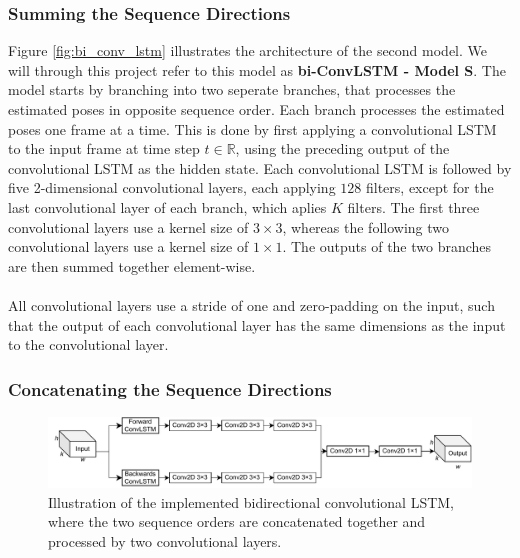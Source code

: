\documentclass[./main.tex]{subfiles}
\begin{document}
\subsubsection{Summing the Sequence Directions}
Figure \ref{fig:bi_conv_lstm} illustrates the architecture of the second model. We will through this project refer to this model as \textbf{bi-ConvLSTM - Model S}. The model starts by branching into two seperate branches, that processes the estimated poses in opposite sequence order. Each branch processes the estimated poses one frame at a time. This is done by first applying a convolutional LSTM to the input frame at time step $t \in \mathbb{R}$, using the preceding output of the convolutional LSTM as the hidden state. Each convolutional LSTM is followed by five 2-dimensional convolutional layers, each applying $128$ filters, except for the last convolutional layer of each branch, which aplies $K$ filters. The first three convolutional layers use a kernel size of $3 \times 3$, whereas the following two convolutional layers use a kernel size of $1 \times 1$. The outputs of the two branches are then summed together element-wise.
\\
\\
All convolutional layers use a stride of one and zero-padding on the input, such that the output of each convolutional layer has the same dimensions as the input to the convolutional layer.

\subsubsection{Concatenating the Sequence Directions}
\begin{figure}[htbp]
    \centering
    \includegraphics[width=\textwidth]{./entities/unipose2.pdf}
    \caption{Illustration of the implemented bidirectional convolutional LSTM, where the two sequence orders are concatenated together and processed by two convolutional layers.}
    \label{fig:unipose2}
\end{figure}
\end{document}
